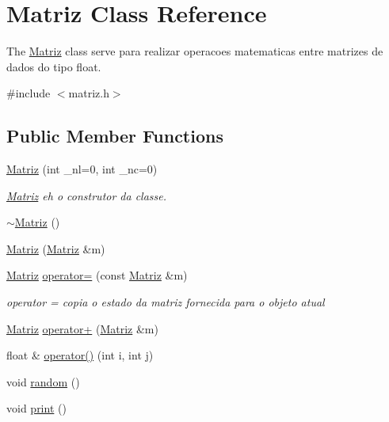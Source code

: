 \hypertarget{class_matriz}{}\section{Matriz Class Reference}
\label{class_matriz}


The \hyperlink{class_matriz}{Matriz} class serve para realizar operacoes matematicas entre matrizes de dados do tipo float.  




{\ttfamily \#include $<$matriz.\+h$>$}

\subsection*{Public Member Functions}
\begin{DoxyCompactItemize}
\item 
\hyperlink{class_matriz_a18222b86b1a474efd88b618aaa956ea3}{Matriz} (int \+\_\+nl=0, int \+\_\+nc=0)
\begin{DoxyCompactList}\small\item\em \hyperlink{class_matriz}{Matriz} eh o construtor da classe. \end{DoxyCompactList}\item 
\hyperlink{class_matriz_a2092b7a289ecec369e1da407d5839f5a}{$\sim$\+Matriz} ()
\item 
\hyperlink{class_matriz_a8f3e37e196821d75d8043339fec10792}{Matriz} (\hyperlink{class_matriz}{Matriz} \&m)
\item 
\hyperlink{class_matriz}{Matriz} \hyperlink{class_matriz_ae31f04bcc48d4d514c025368b392a7b8}{operator=} (const \hyperlink{class_matriz}{Matriz} \&m)
\begin{DoxyCompactList}\small\item\em operator = copia o estado da matriz fornecida para o objeto atual \end{DoxyCompactList}\item 
\hyperlink{class_matriz}{Matriz} \hyperlink{class_matriz_a101ba2a6272922ce7599bc05736186c8}{operator+} (\hyperlink{class_matriz}{Matriz} \&m)
\item 
float \& \hyperlink{class_matriz_a7a84e7fb199e8f55681ac1b594be7ee4}{operator()} (int i, int j)
\item 
void \hyperlink{class_matriz_ae4ae38c97dcbedf305850dbce7275506}{random} ()
\item 
void \hyperlink{class_matriz_af8987741da4cabe0aa054f2e8b077a97}{print} ()
\end{DoxyCompactItemize}


